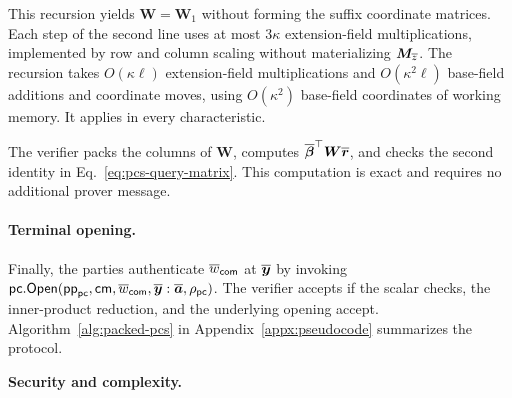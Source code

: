 This recursion yields \(\bm W=\bm W_1\) without forming
the suffix coordinate matrices.
Each step of the second line uses at most \(3\kappa\)
extension-field multiplications, implemented by row and column
scaling without materializing \(\bm M_{\overline{z}}\).
The recursion takes \(O(\kappa\ell)\) extension-field
multiplications and \(O(\kappa^2\ell)\) base-field additions and
coordinate moves, using \(O(\kappa^2)\) base-field coordinates
of working memory. It applies in every characteristic.

The verifier packs the columns of \(\bm W\), computes
\(\overline{\bm\beta}^{\top}\bm W\overline{\bm r}\), and checks the second
identity in Eq.~\eqref{eq:pcs-query-matrix}.
This computation is exact and requires no additional prover message.

\paragraph{Terminal opening.}
Finally, the parties authenticate \(\overline{w}_{\mathsf{com}}\)
at \(\overline{\bm y}\) by invoking
\({\sf pc}.{\sf Open}(\mathsf{pp}_{{\sf pc}},\mathsf{cm},
\overline{w}_{\mathsf{com}},\overline{\bm y}
:\overline{\bm a},\rho_{{\sf pc}})\).
The verifier accepts if the scalar checks, the inner-product
reduction, and the underlying opening accept.
Algorithm~\ref{alg:packed-pcs} in Appendix~\ref{appx:pseudocode}
summarizes the protocol.

\medskip\noindent\textbf{Security and complexity.}

